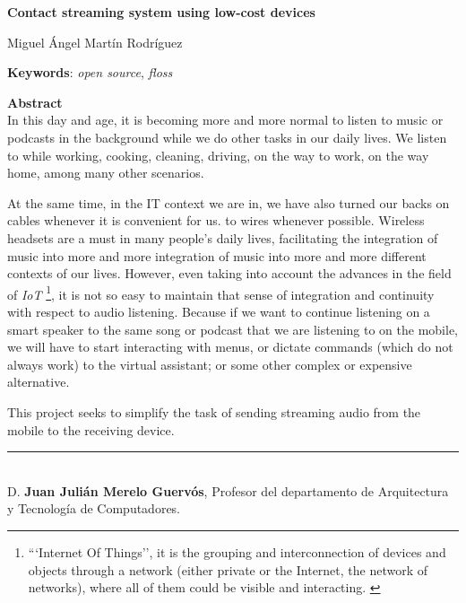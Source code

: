 \cleardoublepage

\begin{center}
	{\large\bfseries Contact streaming system using low-cost devices}\\
\end{center}
\begin{center}
	Miguel Ángel Martín Rodríguez\\
\end{center}
\vspace{0.5cm}
\noindent\textbf{Keywords}: \textit{open source}, \textit{floss}
\vspace{0.7cm}

\noindent\textbf{Abstract}\\
In this day and age, it is becoming more and more normal to listen to music or
podcasts in the background while we do other tasks in our daily lives. We listen
to while working, cooking, cleaning, driving, on the way to work, on the way
home, among many other scenarios. 

At the same time, in the IT context we are in, we have also turned our backs on
cables whenever it is convenient for us. to wires whenever possible. Wireless
headsets are a must in many people's daily lives, facilitating the integration
of music into more and more integration of music into more and more different
contexts of our lives. However, even taking into account the advances in the
field of \emph{IoT} \footnote{```Internet Of Things'', it is the grouping and
interconnection of devices and objects through a network (either private or the
Internet, the network of networks), where all of them could be visible and
interacting. \cite{IoT}}, it is not so easy to maintain that sense of
integration and continuity with respect to audio listening. Because if we want
to continue listening on a smart speaker to the same song or podcast that we are
listening to on the mobile, we will have to start interacting with menus, or
dictate commands (which do not always work) to the virtual assistant; or some
other complex or expensive alternative.

This project seeks to simplify the task of sending streaming audio from the
mobile to the receiving device.

\cleardoublepage

\thispagestyle{empty}

\noindent\rule[-1ex]{\textwidth}{2pt}\\[4.5ex]

D. \textbf{Juan Julián Merelo Guervós}, Profesor del departamento de Arquitectura y Tecnología de Computadores.

